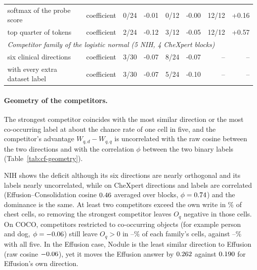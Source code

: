 \documentclass{article}
\begin{document}
\begin{table}[h]
{\begin{tabular}{llrrrrrr}
\quad softmax of the probe score & coefficient & 0/24 & -0.01 & 0/12 & -0.00 & 12/12 & +0.16 \\
\quad top quarter of tokens & coefficient & 2/24 & -0.12 & 3/12 & -0.05 & 12/12 & +0.57 \\
\midrule
\multicolumn{8}{l}{\textit{Competitor family of the logistic normal (5 NIH, 4 CheXpert blocks)}} \\
\quad six clinical directions & coefficient & 3/30 & -0.07 & 8/24 & -0.07 & -- & -- \\
\quad with every extra dataset label & coefficient & 3/30 & -0.07 & 5/24 & -0.10 & -- & -- \\
\bottomrule
\end{tabular}}
\end{table}

\paragraph{Geometry of the competitors.} The strongest competitor coincides with the most similar direction or the most co-occurring label at about the chance rate of one cell in five, and the competitor's advantage $W_{q,d}-W_{q,q}$ is uncorrelated with the raw cosine between the two directions and with the correlation $\phi$ between the two binary labels (Table~\ref{tab:cf-geometry}).

NIH shows the deficit although its six directions are nearly orthogonal and its labels nearly uncorrelated, while on CheXpert directions and labels are correlated (Effusion--Consolidation cosine $0.46$ averaged over blocks, $\phi=0.74$) and the dominance is the same. At least two competitors exceed the own write in \cfGeoTwoAbovePct\% of chest cells, so removing the strongest competitor leaves $O_q$ negative in those cells. On COCO, competitors restricted to co-occurring objects (for example person and dog, $\phi=-0.06$) still leave $O_q>0$ in \cfGeoCocoFamMinPct{}--\cfGeoCocoFamMaxPct\% of each family's cells, against \cfGeoCocoFamFullMinPct{}--\cfGeoCocoFamFullMaxPct\% with all five. In the Effusion case, Nodule is the least similar direction to Effusion (raw cosine $-0.06$), yet it moves the Effusion answer by $0.262$ against $0.190$ for Effusion's own direction.
\end{document}
